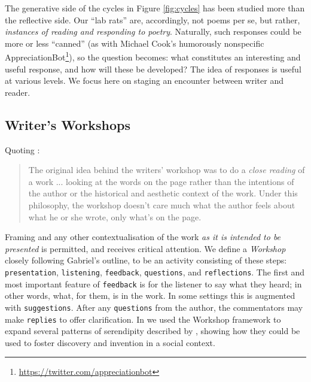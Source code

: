 The generative side of the cycles in Figure \ref{fig:cycles} has been studied more than the reflective side.
Our ``lab rats'' are, accordingly, not poems per se, but rather,
\emph{instances of reading and responding to poetry}.  Naturally, such responses could be more or less
``canned'' (as with Michael Cook's humorously nonspecific
AppreciationBot\footnote{\url{https://twitter.com/appreciationbot}}), so the question becomes: what constitutes an
interesting and useful response, and how will these be
developed?  The idea of responses is useful at various levels.
We focus here on staging an encounter between writer and reader.

\subsection{Writer's Workshops}

Quoting \cite[pp. 2--3]{gabriel2002writer}:

\begin{quote}
The original idea behind the writers' workshop was to do a \emph{close
  reading} of a work%
... looking at the words on the page rather than the
intentions of the author or the historical and aesthetic context of
the work.  Under this philosophy, the workshop doesn't care much what
the author feels about what he or she wrote, only what's on the page.
\end{quote}

Framing and any other contextualisation of the work \emph{as it is intended to be presented} is permitted, and receives critical attention.
We define a \emph{Workshop} closely following
Gabriel's outline, to be an activity consisting of these steps:
{\tt presentation}, {\tt listening}, {\tt feedback}, {\tt questions}, and 
 {\tt reflections}.  The first and most important feature of {\tt feedback} is
 for the listener to say what they heard; in other words, what, for them, is in the work.  In some
 settings this is augmented with {\tt suggestions}.  After any
 {\tt questions} from the author, the commentators may make {\tt replies} to offer clarification. 
In  \cite{feedback-arxiv} we used the Workshop framework 
to expand several patterns of serendipity described by
\cite{van1994anatomy}, showing how they could be used to foster discovery
and invention in a social context.

